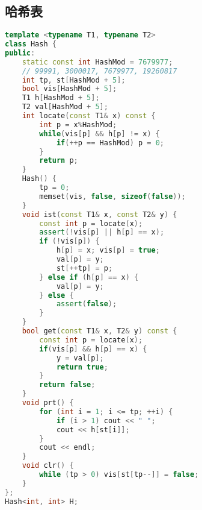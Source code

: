 \subsection{哈希表}

\begin{lstlisting}[language=C++]
template <typename T1, typename T2>
class Hash {
public:
    static const int HashMod = 7679977;
    // 99991, 3000017, 7679977, 19260817
    int tp, st[HashMod + 5];
    bool vis[HashMod + 5];
    T1 h[HashMod + 5];
    T2 val[HashMod + 5];
    int locate(const T1& x) const {
        int p = x%HashMod;
        while(vis[p] && h[p] != x) {
            if(++p == HashMod) p = 0;
        }
        return p;
    }
    Hash() {
        tp = 0;
        memset(vis, false, sizeof(false));
    }
    void ist(const T1& x, const T2& y) {
        const int p = locate(x);
        assert(!vis[p] || h[p] == x);
        if (!vis[p]) {
            h[p] = x; vis[p] = true;
            val[p] = y;
            st[++tp] = p;
        } else if (h[p] == x) {
            val[p] = y;
        } else {
            assert(false);
        }
    }
    bool get(const T1& x, T2& y) const {
        const int p = locate(x);
        if(vis[p] && h[p] == x) {
            y = val[p];
            return true;
        }
        return false;
    }
    void prt() {
        for (int i = 1; i <= tp; ++i) {
            if (i > 1) cout << " ";
            cout << h[st[i]];
        }
        cout << endl;
    }
    void clr() {
        while (tp > 0) vis[st[tp--]] = false;
    }
};
Hash<int, int> H;
\end{lstlisting}